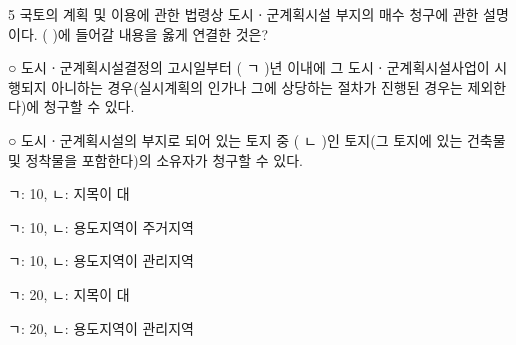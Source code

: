 \begin{question}{5}
국토의 계획 및 이용에 관한 법령상 도시ㆍ군계획시설 부지의 매수 청구에 관한 설명이다. ( )에 들어갈 내용을 옳게 연결한 것은?
\begin{framedtext}
○ 도시ㆍ군계획시설결정의 고시일부터 ( ㄱ )년 이내에 그 도시ㆍ군계획시설사업이 시행되지 아니하는 경우(실시계획의 인가나 그에 상당하는 절차가 진행된 경우는 제외한다)에 청구할 수 있다. \par
○ 도시ㆍ군계획시설의 부지로 되어 있는 토지 중 ( ㄴ )인 토지(그 토지에 있는 건축물 및 정착물을 포함한다)의 소유자가 청구할 수 있다. \par
\end{framedtext}
\begin{choices}
  \item ㄱ: 10, ㄴ: 지목이 대
  \item ㄱ: 10, ㄴ: 용도지역이 주거지역
  \item ㄱ: 10, ㄴ: 용도지역이 관리지역
  \item ㄱ: 20, ㄴ: 지목이 대
  \item ㄱ: 20, ㄴ: 용도지역이 관리지역
\end{choices}
\end{question}
